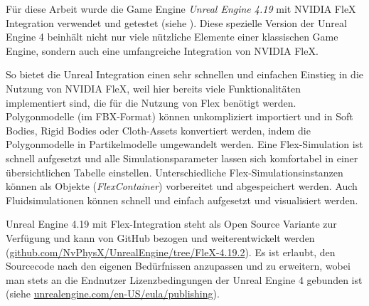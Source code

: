 Für diese Arbeit wurde die Game Engine \textit{Unreal Engine 4.19} mit NVIDIA FleX Integration verwendet und getestet (siehe \cite{UE4FlexDoc}). Diese spezielle Version der Unreal Engine 4 beinhält nicht nur viele nützliche Elemente einer klassischen Game Engine, sondern auch eine umfangreiche Integration von NVIDIA FleX. 

So bietet die Unreal Integration einen sehr schnellen und einfachen Einstieg in die Nutzung von NVIDIA FleX, weil hier bereits viele Funktionalitäten implementiert sind, die für die Nutzung von Flex benötigt werden. Polygonmodelle (im FBX-Format) können unkompliziert importiert und in Soft Bodies, Rigid Bodies oder Cloth-Assets konvertiert werden, indem die Polygonmodelle in Partikelmodelle umgewandelt werden. Eine Flex-Simulation ist schnell aufgesetzt und alle Simulationsparameter lassen sich komfortabel in einer übersichtlichen Tabelle einstellen. Unterschiedliche Flex-Simulationsinstanzen können als Objekte (\textit{FlexContainer}) vorbereitet und abgespeichert werden. Auch Fluidsimulationen können schnell und einfach aufgesetzt und visualisiert werden.

Unreal Engine 4.19 mit Flex-Integration steht als Open Source Variante zur Verfügung und kann von GitHub bezogen und weiterentwickelt werden (\url{github.com/NvPhysX/UnrealEngine/tree/FleX-4.19.2}). Es ist erlaubt, den Sourcecode nach den eigenen Bedürfnissen anzupassen und zu erweitern, wobei man stets an die Endnutzer Lizenzbedingungen der Unreal Engine 4 gebunden ist (siehe \url{unrealengine.com/en-US/eula/publishing}).

%
%
%
%
